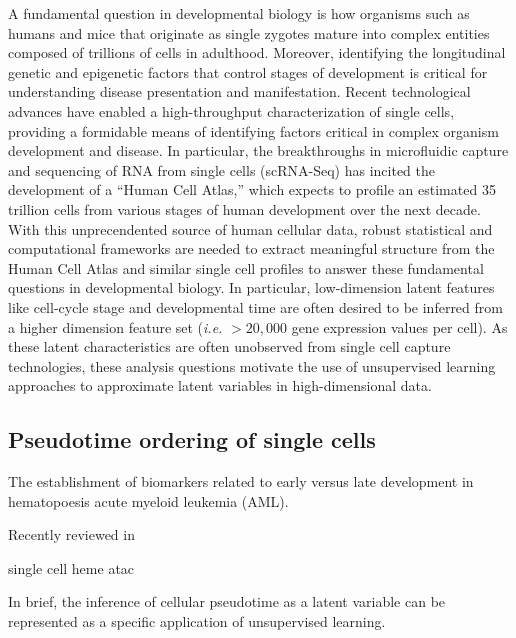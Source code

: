 \documentclass[english, 11pt]{article}\usepackage[]{graphicx}\usepackage[]{color}
\begin{document}
A fundamental question in developmental biology is how organisms such as humans and mice that originate as single zygotes mature into complex entities composed of trillions of cells in adulthood. Moreover, identifying the longitudinal genetic and epigenetic factors that control stages of development is critical for understanding disease presentation and manifestation.  Recent technological advances have enabled a high-throughput characterization of single cells, providing a formidable means of identifying factors critical in complex organism development and disease. In particular, the breakthroughs in microfluidic capture and sequencing of RNA from single cells (scRNA-Seq) has incited the development of a ``Human Cell Atlas,'' which expects to profile an estimated 35 trillion cells from various stages of human development over the next decade. \cite{HCA} 
\newline  \newline 
\noindent With this unprecendented source of human cellular data, robust statistical and computational frameworks are needed to extract meaningful structure from the Human Cell Atlas and similar single cell profiles to answer these fundamental questions in developmental biology. In particular, low-dimension latent features like cell-cycle stage and developmental time are often desired to be inferred from a higher dimension feature set (\textit{i.e.} $> 20,000$ gene expression values per cell). As these latent characteristics are often unobserved from single cell capture technologies, these analysis questions motivate the use of unsupervised learning approaches to approximate latent variables in high-dimensional data. 


\subsection{Pseudotime ordering of single cells}


The establishment of biomarkers related to early versus late development in hematopoesis acute myeloid leukemia (AML). \cite{corces2016lineage} 

 

Recently reviewed in \cite{cannoodt2016computational}

single cell heme atac \cite{buenrostro2017single}


In brief, the inference of cellular pseudotime as a latent variable can be represented as a specific application of unsupervised learning. 
\end{document}
